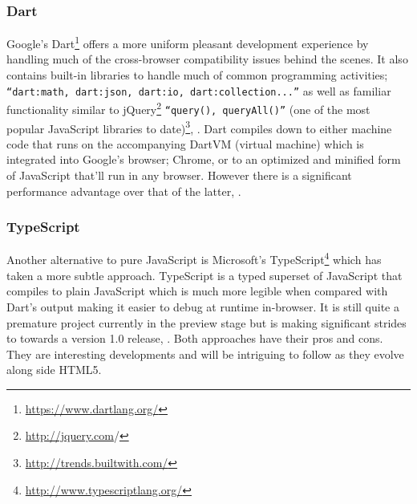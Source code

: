 \documentclass[final]{cmpreport}
\begin{document}
\subsubsection{Dart}
Google's Dart\footnote{\url{https://www.dartlang.org/}} offers a more uniform pleasant development experience by handling much of the cross-browser compatibility issues behind the scenes. It also contains built-in libraries to handle much of common programming activities; \texttt{``dart:math, dart:json, dart:io, dart:collection...''} as well as familiar functionality similar to jQuery\footnote{\url{http://jquery.com}/} \texttt{``query(), queryAll()''} (one of the most popular JavaScript libraries to date)\footnote{\url{http://trends.builtwith.com/}}, \cite{Fortuna}. Dart compiles down to either machine code that runs on the accompanying DartVM (virtual machine) which is integrated into Google's browser; Chrome, or to an optimized and minified form of JavaScript that'll run in any browser. However there is a significant performance advantage over that of the latter, \cite{Schneider}. 

\subsubsection{TypeScript}
Another alternative to pure JavaScript is Microsoft's TypeScript\footnote{\url{http://www.typescriptlang.org/}} which has taken a more subtle approach. TypeScript is a typed superset of JavaScript that compiles to plain JavaScript which is much more legible when compared with Dart's output making it easier to debug at runtime in-browser. It is still quite a premature project currently in the preview stage but is making significant strides to towards a version 1.0 release, \cite{Turner}. Both approaches have their pros and cons. They are interesting developments and will be intriguing to follow as they evolve along side HTML5.


\end{document}
